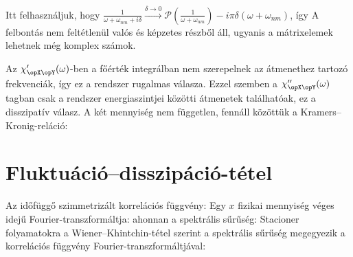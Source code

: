   Itt felhasználjuk, hogy $\frac{1}{\omega+\omega_{nm}+i\delta}\xrightarrow{\delta\to 0}\mathcal{P}\left(\frac{1}{\omega+\omega_{nm}}\right)-i\pi\delta (\omega+\omega_{nm})$, így
  A felbontás nem feltétlenül valós és képzetes részből áll, ugyanis a mátrixelemek lehetnek még komplex számok. 
  
  Az $\chi_{\opX\opY}'(\omega)$-ben a főérték integrálban nem szerepelnek az átmenethez tartozó frekvenciák, így ez a rendszer rugalmas válasza.
   Ezzel szemben a $\chi_{\opX\opY}''(\omega)$ tagban csak a rendszer energiaszintjei közötti átmenetek találhatóak, ez a disszipatív válasz.
   A két mennyiség nem független, fennáll közöttük a Kramers--Kronig-reláció:
  
 \section{Fluktuáció--disszipáció-tétel}\label{ss:B11-fdt}
  
  Az időfüggő szimmetrizált korrelációs függvény:
  Egy $x$ fizikai mennyiség véges idejű Fourier-transzformáltja:
  ahonnan a spektrális sűrűség:
  Stacioner folyamatokra a Wiener--Khintchin-tétel szerint a spektrális sűrűség megegyezik a korrelációs függvény Fourier-transzformáltjával:
  
